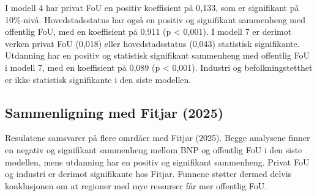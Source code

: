\documentclass[
  letterpaper,
  DIV=11,
  numbers=noendperiod]{scrartcl}
\begin{document}
I modell 4 har privat FoU en positiv koeffisient på 0,133, som er
signifikant på 10\%-nivå. Hovedstadsstatus har også en positiv og
signifikant sammenheng med offentlig FoU, med en koeffisient på 0,911 (p
\textless{} 0,001). I modell 7 er derimot verken privat FoU (0,018)
eller hovedstadsstatus (0,043) statistisk signifikante. Utdanning har en
positiv og statistisk signifikant sammenheng med offentlig FoU i modell
7, med en koeffisient på 0,089 (p \textless{} 0,001). Industri og
befolkningstetthet er ikke statistisk signifikante i den siste modellen.

\subsection{Sammenligning med Fitjar
(2025)}\label{sammenligning-med-fitjar-2025}

Resulatene samsvarer på flere omrdåer med Fitjar (2025). Begge analysene
finner en negativ og signifikant sammenheng mellom BNP og offentlig FoU
i den siste modellen, mens utdanning har en positiv og signifikant
sammenheng. Privat FoU og industri er derimot signifikante hos Fitjar.
Funnene støtter dermed delvis konklusjonen om at regioner med mye
ressurser får mer offentlig FoU.
\end{document}
